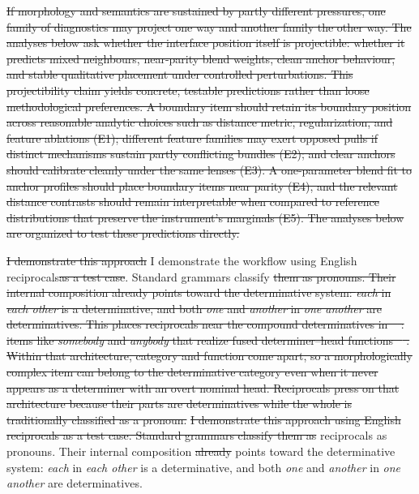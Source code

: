 \documentclass[12pt]{article}
\providecommand{\mention}[1]{\textit{#1}}
\newif\ifcjlsubmission
\providecommand{\DIFaddtex}[1]{{\protect\color{DIFgreen}#1}} %
\providecommand{\DIFdeltex}[1]{{\protect\color{red}\sout{#1}}}                      %
\providecommand{\DIFaddbegin}{} %
\providecommand{\DIFaddend}{} %
\providecommand{\DIFdelbegin}{} %
\providecommand{\DIFdelend}{} %
\providecommand{\DIFadd}[1]{\texorpdfstring{\DIFaddtex{#1}}{#1}} %
\providecommand{\DIFdel}[1]{\texorpdfstring{\DIFdeltex{#1}}{}} %
\newcommand{\DIFscaledelfig}{0.5}
\newlength{\DIFdelgraphicswidth} %
\newlength{\DIFdelgraphicsheight} %
\newcommand{\DIFaddincludegraphics}[2][]{{\color{DIFgreen}\fbox{\DIFOincludegraphics[#1]{#2}}}} %
\newcommand{\DIFdelincludegraphics}[2][]{%
\sbox{\DIFdelgraphicsbox}{\DIFOincludegraphics[#1]{#2}}%
\settoboxwidth{\DIFdelgraphicswidth}{\DIFdelgraphicsbox} %
\settoboxtotalheight{\DIFdelgraphicsheight}{\DIFdelgraphicsbox} %
\scalebox{\DIFscaledelfig}{%
\parbox[b]{\DIFdelgraphicswidth}{\usebox{\DIFdelgraphicsbox}\\[-\baselineskip] \rule{\DIFdelgraphicswidth}{0em}}\llap{\resizebox{\DIFdelgraphicswidth}{\DIFdelgraphicsheight}{%
\setlength{\unitlength}{\DIFdelgraphicswidth}%
\begin{picture}(1,1)%
\thicklines\linethickness{2pt} %
{\color[rgb]{1,0,0}\put(0,0){\framebox(1,1){}}}%
{\color[rgb]{1,0,0}\put(0,0){\line( 1,1){1}}}%
{\color[rgb]{1,0,0}\put(0,1){\line(1,-1){1}}}%
\end{picture}%
}\hspace*{3pt}}} %
} %
\DeclareRobustCommand{\DIFaddbegin}{\DIFOaddbegin \let\includegraphics\DIFaddincludegraphics} %
\DeclareRobustCommand{\DIFaddend}{\DIFOaddend \let\includegraphics\DIFOincludegraphics} %
\DeclareRobustCommand{\DIFdelbegin}{\DIFOdelbegin \let\includegraphics\DIFdelincludegraphics} %
\DeclareRobustCommand{\DIFdelend}{\DIFOaddend \let\includegraphics\DIFOincludegraphics} %
\begin{document}
\DIFdelbegin \DIFdel{If morphology and semantics are sustained by partly different pressures, one family of diagnostics may project one way and another family the other way. The analyses below ask whether the interface position itself is projectible: whether it predicts mixed neighbours, near-parity blend weights, clean anchor behaviour, and stable qualitative placement under controlled perturbations. This projectibility claim yields concrete, testable predictions rather than loose methodological preferences. A boundary item should retain its boundary position across reasonable analytic choices such as distance metric, regularization, and feature ablations (E1); different feature families may exert opposed pulls if distinct mechanisms sustain partly conflicting bundles (E2); and
  clear anchors should calibrate cleanly under the same lenses (E3). A one-parameter blend fit to anchor profiles should place boundary items near parity (E4), and the relevant distance contrasts should remain interpretable when compared to reference distributions that preserve the instrument's marginals (E5).
The analyses below are organized to test these predictions directly.
}%

\DIFdel{I demonstrate this approach }\DIFdelend \DIFaddbegin \DIFadd{I demonstrate the workflow }\DIFaddend using English reciprocals\DIFdelbegin \DIFdel{as a test case}\DIFdelend . Standard grammars classify \DIFdelbegin \DIFdel{them as pronouns. Their internal composition already points toward the determinative system: \mention{each} in \mention{each other} is a determinative, and both \mention{one} and \mention{another} in \mention{one another} are determinatives. This places reciprocals near the compound determinatives in \mbox{%
\textcite[henceforth \textit{CGEL}; Ch. 5 \S9.6]{huddleston2002}}\hskip0pt%
: items like \mention{somebody} and \mention{anybody} that realize fused determiner--head functions \mbox{%
\parencite{Payne2007}}\hskip0pt%
. Within that architecture, category and function come apart, so a morphologically complex item can belong to the determinative category even when it never appears as a determiner with an overt nominal head. Reciprocals press on that architecture because their parts are determinatives while the whole is traditionally classified as a pronoun.
}%
\DIFdel{I demonstrate this approach using English reciprocals as a test case. Standard grammars classify them as }\DIFdelend \DIFaddbegin \DIFadd{reciprocals as }\DIFaddend pronouns. Their internal composition \DIFdelbegin \DIFdel{already }\DIFdelend points toward the determinative system: \mention{each} in \mention{each other} is a determinative, and both \mention{one} and \mention{another} in \mention{one another} are determinatives.
\DIFaddbegin 
\end{document}
